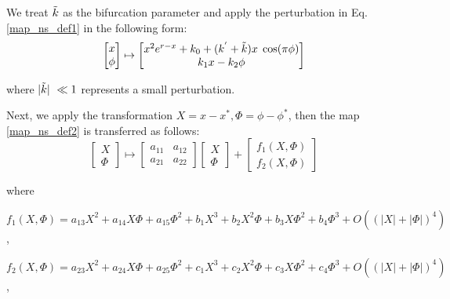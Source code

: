\documentclass{article}
\begin{document}
\noindent We treat $\Tilde{k}$ as the bifurcation parameter and apply the perturbation in Eq. \eqref{map_ns_def1} in the following form:
\begin{equation}\label{map_ns_def2}
 \begin{bmatrix} x \\ \phi \end{bmatrix}  \mapsto \begin{bmatrix} x^{2}e^{r-x}+k_0+(k^{'}+\Tilde{k})x\;\cos(\pi\phi) \\ k_{1}x-k_{2}\phi \end{bmatrix}
\end{equation}

\noindent where $\lvert\Tilde{k} \rvert\ \ll 1$ represents a small perturbation.

\noindent Next, we apply the transformation $X=x-x^*, \Phi=\phi-\phi^*$, then the map \eqref{map_ns_def2} is transferred as follows:
\begin{equation}\label{map_ns_def3}
 \begin{bmatrix} X \\ \Phi \end{bmatrix}  \mapsto 
  \begin{bmatrix} a_{11} & a_{12} \\ a_{21} & a_{22} \end{bmatrix}  \begin{bmatrix} X \\ \Phi \end{bmatrix}+
 \begin{bmatrix} f_{1}(X,\Phi) \\ f_{2}(X,\Phi)
 \end{bmatrix}
\end{equation}

\noindent where

$f_{1}(X,\Phi)=a_{13}X^2+a_{14}X{\Phi}+a_{15}\Phi^2+b_{1}X^3+b_{2}X^{2}\Phi+b_{3}X\Phi^2+b_{4}\Phi^3+O\left((\lvert X \rvert+ \lvert \Phi \rvert)^4\right)$,

\vspace{0.2cm}
$f_{2}(X,\Phi)=a_{23}X^2+a_{24}X{\Phi}+a_{25}\Phi^2+c_{1}X^3+c_{2}X^{2}\Phi+c_{3}X\Phi^2+c_{4}\Phi^3+O\left((\lvert X \rvert+ \lvert \Phi \rvert)^4\right)$,
\end{document}
